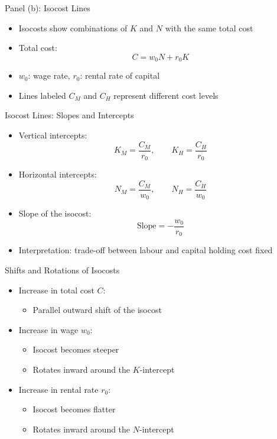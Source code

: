 \documentclass[aspectratio=169]{beamer}
\begin{document}
\begin{frame}{Panel (b): Isocost Lines}
\begin{itemize}[<+->]
\item Isocosts show combinations of $K$ and $N$ with the same total cost
\item Total cost:
\[
C = w_0 N + r_0 K
\]
\item $w_0$: wage rate, $r_0$: rental rate of capital
\item Lines labeled $C_M$ and $C_H$ represent different cost levels
\end{itemize}
\end{frame}


\begin{frame}{Isocost Lines: Slopes and Intercepts}
\begin{itemize}[<+->]
\item Vertical intercepts:
\[
K_M = \frac{C_M}{r_0}, \qquad K_H = \frac{C_H}{r_0}
\]
\item Horizontal intercepts:
\[
N_M = \frac{C_M}{w_0}, \qquad N_H = \frac{C_H}{w_0}
\]
\item Slope of the isocost:
\[
\text{Slope} = -\frac{w_0}{r_0}
\]
\item Interpretation: trade-off between labour and capital holding cost fixed
\end{itemize}
\end{frame}


\begin{frame}{Shifts and Rotations of Isocosts}
\begin{itemize}[<+->]
\item Increase in total cost $C$:
\begin{itemize}[<+->]
\item Parallel outward shift of the isocost
\end{itemize}
\item Increase in wage $w_0$:
\begin{itemize}[<+->]
\item Isocost becomes steeper
\item Rotates inward around the $K$-intercept
\end{itemize}
\item Increase in rental rate $r_0$:
\begin{itemize}[<+->]
\item Isocost becomes flatter
\item Rotates inward around the $N$-intercept
\end{itemize}
\end{itemize}
\end{frame}
\end{document}
